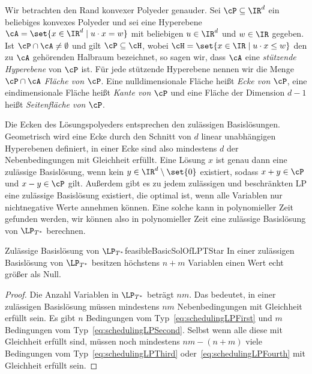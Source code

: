 \documentclass[language=ngerman,algolist]{TemplateLecture}
\begin{document}
Wir betrachten den Rand konvexer Polyeder genauder. Sei $\cP \subseteq \IR^d$ ein beliebiges konvexes Polyeder und sei eine Hyperebene $\cA = \set{x \in \IR^d \mid u \cdot x = w}$ mit beliebigen $u \in \IR^d$ und $w \in \IR$ gegeben. Ist $\cP \cap \cA \neq \emptyset$ und gilt $\cP \subseteq \cH$, wobei $\cH = \set{x \in \IR \mid u \cdot x \leq w}$ den zu $\cA$ gehörenden Halbraum bezeichnet, so sagen wir, dass $\cA$ eine \emph{stützende Hyperebene} von $\cP$ ist. Für jede stützende Hyperebene nennen wir die Menge $\cP \cap \cA$ \emph{Fläche von $\cP$}. Eine nulldimensionale Fläche heißt \emph{Ecke von $\cP$}, eine eindimensionale Fläche heißt \emph{Kante von $\cP$} und eine Fläche der Dimension $d-1$ heißt \emph{Seitenfläche von $\cP$}.

Die Ecken des Lösungspolyeders entsprechen den zulässigen Basislösungen. Geometrisch wird eine Ecke durch den Schnitt von $d$ linear unabhängigen Hyperebenen definiert, in einer Ecke sind also mindestens $d$ der Nebenbedingungen mit Gleichheit erfüllt. Eine Lösung $x$ ist genau dann eine zulässige Basislösung, wenn kein $y \in \IR^d \setminus \set{0}$ existiert, sodass $x + y \in \cP$ und $x - y \in \cP$ gilt. Außerdem gibt es zu jedem zulässigen und beschränkten LP eine zulässige Basislösung existiert, die optimal ist, wenn alle Variablen nur nichtnegative Werte annehmen können. Eine solche kann in polynomieller Zeit gefunden werden, wir können also in polynomieller Zeit eine zulässige Basislösung von $\LP_{T^*}$ berechnen.

\begin{lem}{Zulässige Basislösung von $\LP_{T^*}$}{feasibleBasicSolOfLPTStar}
    In einer zulässigen Basislösung von $\LP_{T^*}$ besitzen höchstens $n + m$ Variablen einen Wert echt größer als Null.
\end{lem}
\begin{proof}
    Die Anzahl Variablen in $\LP_{T^*}$ beträgt $nm$. Das bedeutet, in einer zulässigen Basislösung müssen mindestens $nm$ Nebenbedingungen mit Gleichheit erfüllt sein. Es gibt $n$ Bedingungen vom Typ~\eqref{eq:schedulingLPFirst} und $m$ Bedingungen vom Typ~\eqref{eq:schedulingLPSecond}. Selbst wenn alle diese mit Gleichheit erfüllt sind, müssen noch mindestens $nm-(n+m)$ viele Bedingungen vom Typ~\eqref{eq:schedulingLPThird} oder~\eqref{eq:schedulingLPFourth} mit Gleichheit erfüllt sein.
\end{proof}
\end{document}
